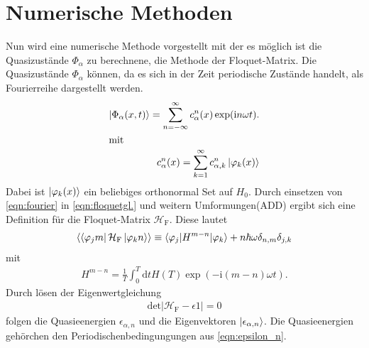 \section{Numerische Methoden}
Nun wird eine numerische Methode vorgestellt mit der es möglich ist
die Quasizustände $\Phi_\alpha$ zu berechnene, die Methode der Floquet-Matrix.
Die Quasizustände $\Phi_\alpha$ können, da es sich in der Zeit periodische Zustände handelt,
als Fourierreihe dargestellt werden.
\begin{align}
  \ket{\Phi_{\alpha}(x,t)}=\sum_{n=-\infty}^{\infty} c_{\alpha}^n (x) \label{eqn:fourier}
  \exp(\mathrm{i}n\omega t).\\
\intertext{mit}
 c_\alpha^n(x)=\sum_{k=1}^\infty c_{\alpha,k}^n \ket{\varphi_k(x)} %
\end{align}
Dabei ist $\ket{\varphi_k(x)}$ ein beliebiges orthonormal Set auf $H_0$.
Durch einsetzen von \eqref{eqn:fourier} in \eqref{eqn:floquetgl.}
und weitern Umformungen(ADD) ergibt sich eine Definition für die Floquet-Matrix $\mathcal{H}_\mathrm{F}$.
Diese lautet
\begin{align}
  \braket{\bra{\varphi_j m}\mathcal{H}_\mathrm{F}\ket{\varphi_k n}}\equiv \braket{\varphi_j|H^{m-n}|\varphi_k} + n\hbar \omega \delta_{n,m}\delta_{j,k}
\end{align}
mit
\begin{align}
H^{m-n}=\frac{1}{T}\int_0^T \mathrm{d}t H(T) \exp\left(-\mathrm{i}(m-n)\omega t\right).
\end{align}
Durch lösen der Eigenwertgleichung
\begin{align}
  \mathrm{det}|\mathcal{H}_\mathrm{F}-\epsilon\mathcal{1}|=0
\end{align}
folgen die Quasieenergien $\epsilon_{\alpha,n}$ und die Eigenvektoren $\ket{\epsilon_{\alpha,n}}$.
Die Quasieenergien gehörchen den Periodischenbedingungungen aus \eqref{eqn:epsilon_n}.
